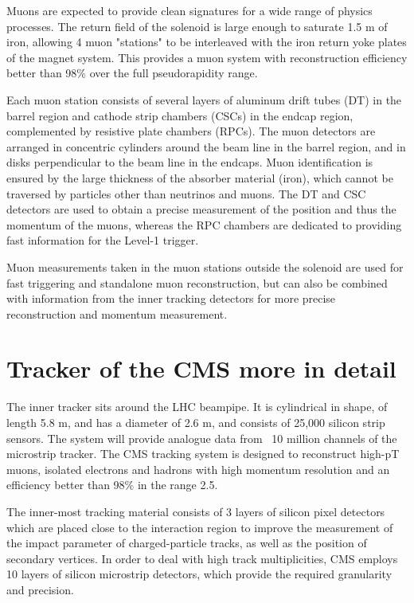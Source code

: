 Muons are expected to provide clean signatures for a wide range of physics processes.
The return field of the solenoid is large enough to saturate 1.5 m of iron, allowing 4 muon "stations" to be interleaved with the iron return yoke plates of the magnet system. 
This provides a muon system with reconstruction efficiency better than 98\% over the full pseudorapidity range.

Each muon station consists of several layers of aluminum drift tubes (DT) in the barrel region and cathode strip chambers (CSCs) in the endcap region, complemented by resistive plate chambers (RPCs). 
The muon detectors are arranged in concentric cylinders around the beam line in the barrel region, and in disks perpendicular to the beam line in the endcaps. 
Muon identification is ensured by the large thickness of the absorber material (iron), which cannot be traversed by particles other than neutrinos and muons. 
The DT and CSC detectors are used to obtain a precise measurement of the position and thus the momentum of the muons, whereas the RPC chambers are dedicated to providing fast information for the Level-1 trigger.

Muon measurements taken in the muon stations outside the solenoid are used for fast triggering and standalone muon reconstruction, but can also be combined with information from the inner tracking detectors for more precise reconstruction and momentum measurement.

\section{Tracker of the CMS more in detail}

The inner tracker sits around the LHC beampipe. It is cylindrical in shape, of length 5.8 m, and has a diameter of 2.6 m, and consists of 25,000 silicon strip sensors. 
The system will provide analogue data from ~10 million channels of the microstrip tracker. 
The CMS tracking system is designed to reconstruct high-pT muons, isolated electrons and hadrons with high momentum resolution and an efficiency better than 98\% in the range 2.5.

The inner-most tracking material consists of 3 layers of silicon pixel detectors which are placed close to the interaction region to improve the measurement of the impact parameter of charged-particle tracks, as well as the position of secondary vertices. 
In order to deal with high track multiplicities, CMS employs 10 layers of silicon microstrip detectors, which provide the required granularity and precision.

